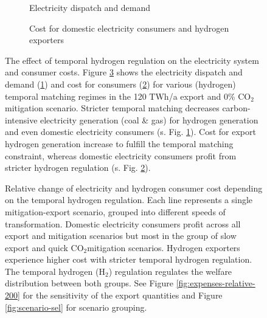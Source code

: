 \documentclass[5p,numafflabel]{elsarticle}
\newcommand{\co}{\ce{CO2}~}
\def\co{CO${}_2${\:}}
\begin{document}
\begin{figure}[h!]
    \centering
    \begin{subfigure}[b]{0.49\linewidth}
        \centering
        \caption{Electricity dispatch and demand}
        \label{fig:dispatch_rule}
    \end{subfigure}
    \hfill
    \begin{subfigure}[b]{0.49\linewidth}
        \centering
        \caption{Cost for domestic electricity consumers and hydrogen exporters}
        \label{fig:expense_h2ac}
    \end{subfigure}
    \hfill
    \caption{
    The effect of temporal hydrogen regulation on the electricity system and consumer costs.
    Figure \ref{fig:expenses_rule} shows the electricity dispatch and demand (\ref{fig:dispatch_rule}) and cost for consumers (\ref{fig:expense_h2ac}) for various (hydrogen) temporal matching regimes in the 120 TWh/a export and 0\% \co mitigation scenario. Stricter temporal matching decreases carbon-intensive electricity generation (coal \& gas) for hydrogen generation and even domestic electricity consumers (s. Fig. \ref{fig:dispatch_rule}). Cost for export hydrogen generation increase to fulfill the temporal matching constraint, whereas domestic electricity consumers profit from stricter hydrogen regulation (s. Fig. \ref{fig:expense_h2ac}).}
    \label{fig:expenses_rule}
\end{figure}


\begin{figure}[h!]
    \centering
    \caption{Relative change of electricity and hydrogen consumer cost depending on the temporal hydrogen regulation. Each line represents a single mitigation-export scenario, grouped into different speeds of transformation. Domestic electricity consumers profit across all export and mitigation scenarios but most in the group of slow export and quick \co mitigation scenarios. Hydrogen exporters experience higher cost with stricter temporal hydrogen regulation. The temporal hydrogen ({H${}_2${}}) regulation regulates the welfare distribution between both groups. See Figure \ref{fig:expenses-relative-200} for the sensitivity of the export quantities and Figure \ref{fig:scenario-sel} for scenario grouping.}
    \label{fig:expenses-relative-120}
\end{figure}
\end{document}
